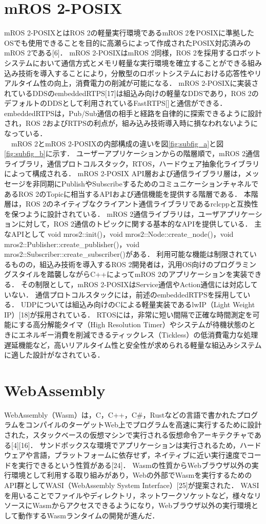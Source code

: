 \section{mROS 2-POSIX}
mROS 2-POSIXとはROS 2の軽量実行環境であるmROS 2をPOSIXに準拠したOSでも使用できることを目的に高瀬らによって作成されたPOSIX対応済みのmROS 2である[6]．
mROS 2-POSIXはmROS 2同様，ROS 2を採用するロボットシステムにおいて通信方式とメモリ軽量な実行環境を確立することができる組み込み技術を導入することにより，分散型のロボットシステムにおける応答性やリアルタイム性の向上，消費電力の削減が可能になる．
mROS 2-POSIXに実装されているDDSのembeddedRTPS[17]は組込み向けの軽量なDDSであり，ROS 2のデフォルトのDDSとして利用されているFastRTPS[]と通信ができる．
embeddedRTPSは，Pub/Sub通信の相手と経路を自律的に探索できるように設計され，ROS 2およびRTPSの利点が，組み込み技術導入時に損なわれないようになっている．
\\　mROS 2とmROS 2-POSIXの内部構成の違いを図\ref{fig:subfig_a}と図\ref{fig:subfig_b}に示す．
ユーザーアプリケーションからの階層順で，mROS 2通信ライブラリ，通信プロトコルスタック，RTOS，ハードウェア抽象化ライブラリによって構成される．
mROS 2-POSIX API層および通信ライブラリ層は，メッセージを非同期にPublishやSubscribeするためのコミュニケーションチャネルであるROS 2のTopicに相当するAPIおよび通信機能を提供する階層である．
本階層は，ROS 2のネイティブなクライアント通信ライブラリであるrclcppと互換性を保つように設計されている．
mROS 2通信ライブラリは，ユーザアプリケーションに対して，ROS 2通信のトピックに関する基本的なAPIを提供している．
主なAPIとして void mros2::init()，void mros2::Node::create\_node()，void mros2::Publisher::create\_publisher()，void mros2::Subscriber::create\_subscriber()がある．
利用可能な機能は制限されているものの，組込み技術を導入するROS 2開発者は，汎用OS向けのプログラミングスタイルを踏襲しながらC++によってmROS 2のアプリケーションを実装できる．
その制限として，mROS 2-POSIXはService通信やAction通信には対応していない．
通信プロトコルスタックには，前述のembeddedRTPSを採用している．
UDPについては組込み向けのCによる軽量実装であるlwIP（Light Weight IP）[18]が採用されている．
RTOSには，非常に短い間隔で正確な時間測定を可能にする高分解能タイマ（High Resolution Timer）やシステムが待機状態のときにエネルギー消費を削減できるティックレス（Tickless）の低消費電力な処理遅延機能など，高いリアルタイム性と安全性が求められる軽量な組込みシステムに適した設計がなされている．
\section{WebAssembly}
WebAssembly（Wasm）は，C，C++，C\#，Rustなどの言語で書かれたプログラムをコンパイルのターゲットWeb上でプログラムを高速に実行するために設計された，スタックベースの仮想マシンで実行される仮想命令アーキテクチャである[4][16]．
サンドボックスな環境でアプリケーションは実行されるため，ハードウェアや言語，プラットフォームに依存せず，ネイティブに近い実行速度でコードを実行できるという性質がある[24]．
Wasmの性質からWebブラウザ以外の実行環境として利用する取り組みがあり，Webの外部でWasmを実行するためのAPI群としてWASI（WebAssembly System Interface）[25]が提案された．
WASIを用いることでファイルやディレクトリ，ネットワークソケットなど，様々なリソースにWasmからアクセスできるようになり，Webブラウザ以外の実行環境として動作するWasmランタイムの開発が進んだ．
